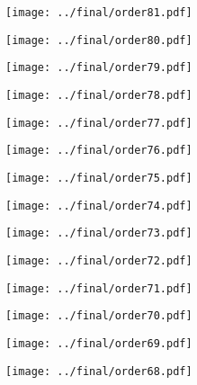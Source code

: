 \documentclass{article}
\begin{document}
\begin{figure}[H]
    \centering
    \texttt{[image: ../final/order81.pdf]}
\end{figure}
\begin{figure}[H]
    \centering
    \texttt{[image: ../final/order80.pdf]}
\end{figure}
\begin{figure}[H]
    \centering
    \texttt{[image: ../final/order79.pdf]}
\end{figure}
\begin{figure}[H]
    \centering
    \texttt{[image: ../final/order78.pdf]}
\end{figure}
\begin{figure}[H]
    \centering
    \texttt{[image: ../final/order77.pdf]}
\end{figure}
\begin{figure}[H]
    \centering
    \texttt{[image: ../final/order76.pdf]}
\end{figure}
\begin{figure}[H]
    \centering
    \texttt{[image: ../final/order75.pdf]}
\end{figure}
\begin{figure}[H]
    \centering
    \texttt{[image: ../final/order74.pdf]}
\end{figure}
\begin{figure}[H]
    \centering
    \texttt{[image: ../final/order73.pdf]}
\end{figure}
\begin{figure}[H]
    \centering
    \texttt{[image: ../final/order72.pdf]}
\end{figure}
\begin{figure}[H]
    \centering
    \texttt{[image: ../final/order71.pdf]}
\end{figure}
\begin{figure}[H]
    \centering
    \texttt{[image: ../final/order70.pdf]}
\end{figure}
\begin{figure}[H]
    \centering
    \texttt{[image: ../final/order69.pdf]}
\end{figure}
\begin{figure}[H]
    \centering
    \texttt{[image: ../final/order68.pdf]}
\end{figure}
\end{document}

